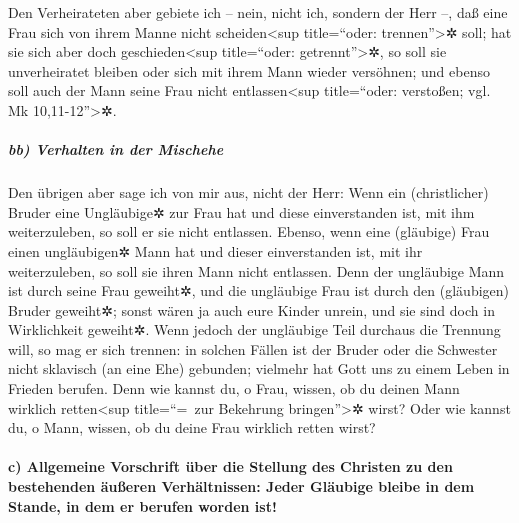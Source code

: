 Den Verheirateten aber gebiete ich -- nein, nicht ich,
sondern der Herr --, daß eine Frau sich von ihrem Manne nicht
scheiden\textless sup title=``oder: trennen''\textgreater✲ soll;
 hat sie sich aber doch geschieden\textless sup
title=``oder: getrennt''\textgreater✲, so soll sie unverheiratet bleiben
oder sich mit ihrem Mann wieder versöhnen; und ebenso soll auch der Mann
seine Frau nicht entlassen\textless sup title=``oder: verstoßen; vgl. Mk
10,11-12''\textgreater✲.

\hypertarget{bb-verhalten-in-der-mischehe}{%
\subparagraph{bb) Verhalten in der
Mischehe}\label{bb-verhalten-in-der-mischehe}}

 Den übrigen aber sage ich von mir aus, nicht der Herr:
Wenn ein (christlicher) Bruder eine Ungläubige✲ zur Frau hat und diese
einverstanden ist, mit ihm weiterzuleben, so soll er sie nicht
entlassen.  Ebenso, wenn eine (gläubige) Frau einen
ungläubigen✲ Mann hat und dieser einverstanden ist, mit ihr
weiterzuleben, so soll sie ihren Mann nicht entlassen. 
Denn der ungläubige Mann ist durch seine Frau geweiht✲, und die
ungläubige Frau ist durch den (gläubigen) Bruder geweiht✲; sonst wären
ja auch eure Kinder unrein, und sie sind doch in Wirklichkeit geweiht✲.
 Wenn jedoch der ungläubige Teil durchaus die Trennung
will, so mag er sich trennen: in solchen Fällen ist der Bruder oder die
Schwester nicht sklavisch (an eine Ehe) gebunden; vielmehr hat Gott uns
zu einem Leben in Frieden berufen.  Denn wie kannst du, o
Frau, wissen, ob du deinen Mann wirklich retten\textless sup
title=``=~zur Bekehrung bringen''\textgreater✲ wirst? Oder wie kannst
du, o Mann, wissen, ob du deine Frau wirklich retten wirst?

\hypertarget{c-allgemeine-vorschrift-uxfcber-die-stellung-des-christen-zu-den-bestehenden-uxe4uuxdferen-verhuxe4ltnissen-jeder-gluxe4ubige-bleibe-in-dem-stande-in-dem-er-berufen-worden-ist}{%
\paragraph{c) Allgemeine Vorschrift über die Stellung des Christen zu
den bestehenden äußeren Verhältnissen: Jeder Gläubige bleibe in dem
Stande, in dem er berufen worden
ist!}\label{c-allgemeine-vorschrift-uxfcber-die-stellung-des-christen-zu-den-bestehenden-uxe4uuxdferen-verhuxe4ltnissen-jeder-gluxe4ubige-bleibe-in-dem-stande-in-dem-er-berufen-worden-ist}}

